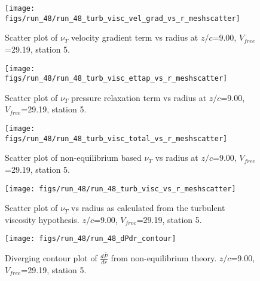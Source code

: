 \begin{figure}[H]
\centering
\texttt{[image: figs/run\_48/run\_48\_turb\_visc\_vel\_grad\_vs\_r\_meshscatter]}
\caption{Scatter plot of $\nu_T$ velocity gradient term vs radius at $z/c$=9.00, $V_{free}$=29.19, station 5.}
\end{figure}


\begin{figure}[H]
\centering
\texttt{[image: figs/run\_48/run\_48\_turb\_visc\_ettap\_vs\_r\_meshscatter]}
\caption{Scatter plot of $\nu_T$ pressure relaxation term vs radius at $z/c$=9.00, $V_{free}$=29.19, station 5.}
\end{figure}


\begin{figure}[H]
\centering
\texttt{[image: figs/run\_48/run\_48\_turb\_visc\_total\_vs\_r\_meshscatter]}
\caption{Scatter plot of non-equilibrium based $\nu_T$ vs radius at $z/c$=9.00, $V_{free}$=29.19, station 5.}
\end{figure}


\begin{figure}[H]
\centering
\texttt{[image: figs/run\_48/run\_48\_turb\_visc\_vs\_r\_meshscatter]}
\caption{Scatter plot of $\nu_T$ vs radius as calculated from the turbulent viscosity hypothesis. $z/c$=9.00, $V_{free}$=29.19, station 5.}
\end{figure}


\begin{figure}[H]
\centering
\texttt{[image: figs/run\_48/run\_48\_dPdr\_contour]}
\caption{Diverging contour plot of $\frac{d\bar{P}}{dr}$ from non-equilibrium theory. $z/c$=9.00, $V_{free}$=29.19, station 5.}
\end{figure}


